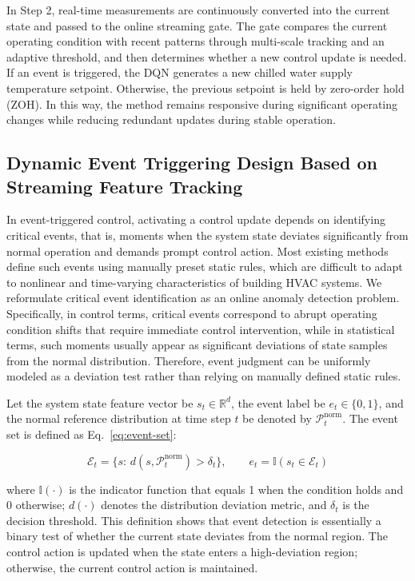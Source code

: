 \documentclass[preprint,12pt,number]{elsarticle}
\begin{document}
In Step 2, real-time measurements are continuously converted into the current state and passed to the online streaming gate. The gate compares the current operating condition with recent patterns through multi-scale tracking and an adaptive threshold, and then determines whether a new control update is needed. If an event is triggered, the DQN generates a new chilled water supply temperature setpoint. Otherwise, the previous setpoint is held by zero-order hold (ZOH). In this way, the method remains responsive during significant operating changes while reducing redundant updates during stable operation.

\subsection{Dynamic Event Triggering Design Based on Streaming Feature Tracking}\label{dynamic-event-triggering-design-based-on-streaming-feature-tracking}

In event-triggered control, activating a control update depends on identifying critical events, that is, moments when the system state deviates significantly from normal operation and demands prompt control action. Most existing methods define such events using manually preset static rules, which are difficult to adapt to nonlinear and time-varying characteristics of building HVAC systems. We reformulate critical event identification as an online anomaly detection problem. Specifically, in control terms, critical events correspond to abrupt operating condition shifts that require immediate control intervention, while in statistical terms, such moments usually appear as significant deviations of state samples from the normal distribution. Therefore, event judgment can be uniformly modeled as a deviation test rather than relying on manually defined static rules.

Let the system state feature vector be \(s_t\in\mathbb{R}^d\), the event label be \(e_t\in\{0,1\}\), and the normal reference distribution at time step \(t\) be denoted by \(\mathcal{P}^{\text{norm}}_t\). The event set is defined as Eq.~\eqref{eq:event-set}:

\[
\mathcal{E}_t=\{s:\,d(s,\mathcal{P}^{\text{norm}}_t)>\delta_t\},\qquad
e_t=\mathbb{I}(s_t\in\mathcal{E}_t) \tag{1}\label{eq:event-set}
\]

\noindent where \(\mathbb{I}(\cdot)\) is the indicator function that equals 1 when the condition holds and 0 otherwise; \(d(\cdot)\) denotes the distribution deviation metric, and \(\delta_t\) is the decision threshold. This definition shows that event detection is essentially a binary test of whether the current state deviates from the normal region. The control action is updated when the state enters a high-deviation region; otherwise, the current control action is maintained.
\end{document}

